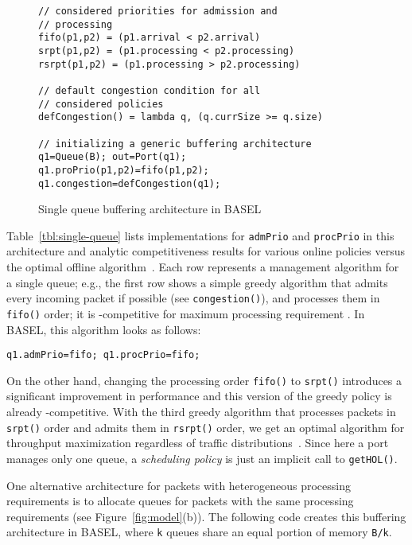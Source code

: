 \documentclass{article}
\newcommand{\barch}{BASEL}
\begin{document}
\newcommand{\ttfamsm}[1]{{\ttfamily\small #1}}

\begin{figure}[h]
\begin{lstlisting}[frame=tb,
	basicstyle=\ttfamily\small]
// considered priorities for admission and 
// processing
fifo(p1,p2) = (p1.arrival < p2.arrival)
srpt(p1,p2) = (p1.processing < p2.processing)
rsrpt(p1,p2) = (p1.processing > p2.processing)

// default congestion condition for all 
// considered policies
defCongestion() = lambda q, (q.currSize >= q.size)

// initializing a generic buffering architecture
q1=Queue(B); out=Port(q1);
q1.proPrio(p1,p2)=fifo(p1,p2);
q1.congestion=defCongestion(q1);
\end{lstlisting}
\vspace{-5pt}
\caption{Single queue buffering architecture in \barch{}}\label{list:inst}
\end{figure}


Table~\ref{tbl:single-queue} lists implementations for \lstinline|admPrio| and \lstinline|procPrio| in this architecture and analytic competitiveness results for various online policies versus the optimal offline algorithm~\cite{KeslassyKSS12,NikolenkoK15}.
Each row represents a management algorithm for a single queue; e.g., the first row shows a simple greedy algorithm that admits every incoming packet if possible (see \lstinline|congestion()|), and processes them in \lstinline|fifo()| order; it is -competitive for maximum processing requirement . In \barch{}, this algorithm looks as follows:


\begin{lstlisting}[basicstyle=\ttfamily\footnotesize]
q1.admPrio=fifo; q1.procPrio=fifo;
\end{lstlisting}

\noindent
On the other hand, changing the processing order \lstinline|fifo()| to
\lstinline|srpt()| introduces a significant improvement in performance
and this version of the greedy policy is already -competitive. 
With the third greedy algorithm that processes packets in \lstinline|srpt()| order and admits them in \lstinline|rsrpt()| order, we get an optimal algorithm for throughput maximization regardless of traffic distributions~\cite{KeslassyKSS12}. Since here a port manages only one queue, a \emph{scheduling policy} is just an implicit call to \lstinline|getHOL()|.

One alternative architecture for packets with heterogeneous processing
requirements is to allocate queues for packets with the same processing requirements (see Figure~\ref{fig:model}(b)). 
The following code creates this buffering architecture in \barch{},
where \lstinline|k| queues share an equal portion of memory \lstinline|B/k|.
\end{document}
